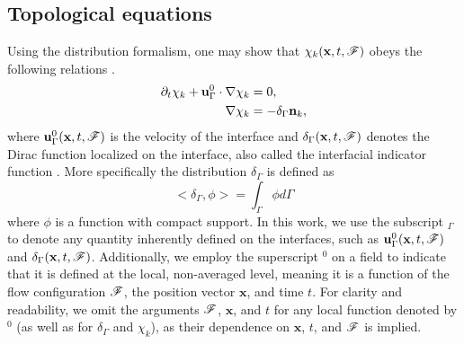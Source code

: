 \subsection{Topological equations}
Using the distribution formalism, one may show that $\chi_k(\textbf{x},t,\mathscr{F})$ obeys the following relations \citep{drew1983mathematical}. 
\begin{align}
    \pddt \chi_k
    + \textbf{u}_\Gamma^0 \cdot \grad \chi_k
    &= 0,
    \label{eq:dt_chi_k}\\
    \label{eq:grad_chi_k}
    \grad \chi_k
    &= - \delta_\Gamma \textbf{n}_k, 
\end{align}
where $\textbf{u}^0_\Gamma(\textbf{x},t,\mathscr{F})$ is the velocity of the interface and $\delta_\Gamma(\textbf{x},t,\mathscr{F})$ denotes the Dirac function localized on the interface, also called the interfacial indicator function \citep{drew1983mathematical,junqua2003}. 
More specifically the distribution $\delta_\Gamma$ is defined as \citep{appel2007}
\begin{equation}
<\delta_\Gamma,\phi> =\int_{\Gamma} \phi d\Gamma 
\label{eq:def_surf_distribution}
\end{equation}  
where $\phi$ is a function with compact support. %
In this work, we use the subscript $_\Gamma$ to denote any quantity inherently defined on the interfaces, such as $\textbf{u}_\Gamma^0(\textbf{x}, t, \mathscr{F})$ and $\delta_\Gamma(\textbf{x}, t, \mathscr{F})$. Additionally, we employ the superscript $^0$ on a field to indicate that it is defined at the local, non-averaged level, meaning it is a function of the flow configuration $\mathscr{F}$, the position vector $\textbf{x}$, and time $t$. For clarity and readability, we omit the arguments $\mathscr{F}$, $\textbf{x}$, and $t$ for any local function denoted by $^0$ (as well as for $\delta_\Gamma$ and $\chi_k$), as their dependence on $\textbf{x}$, $t$, and $\mathscr{F}$ is implied.

